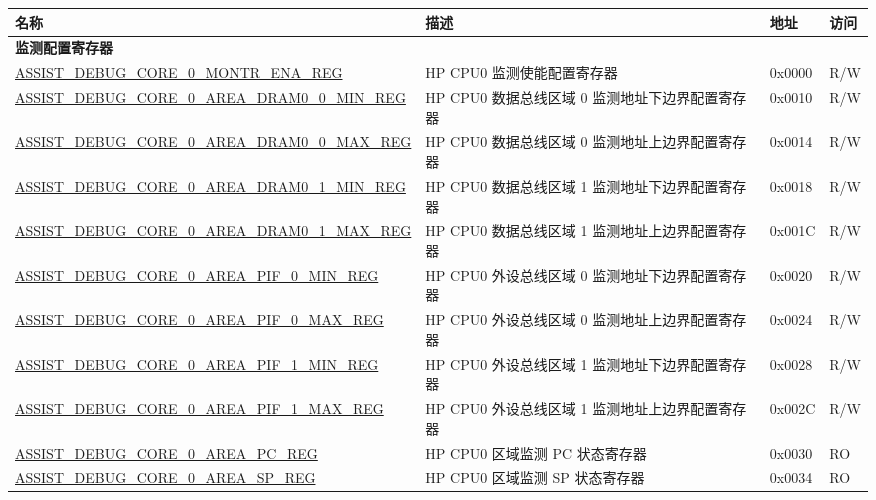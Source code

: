 \begin{longtable}{ | p{8.7cm} | m{5cm} | p{1.2cm} | p{0.75cm} | }
\hline\rowcolor{lightgray}
{\bfseries 名称} & {\bfseries 描述} &  {\bfseries 地址} & {\bfseries 访问} \\ \hline
\endhead
\multicolumn{4}{|l|}{\textbf{监测配置寄存器}} \\ \hline
\hyperref[regdesc:ASSISTDEBUGCORE0MONTRENAREG]{ASSIST\_DEBUG\_CORE\_0\_MONTR\_ENA\_REG} & HP CPU0 监测使能配置寄存器 & 0x0000 & R/W \\ \hline
\hyperref[regdesc:ASSISTDEBUGCORE0AREADRAM00MINREG]{ASSIST\_DEBUG\_CORE\_0\_AREA\_DRAM0\_0\_MIN\_REG} & HP CPU0 数据总线区域 0 监测地址下边界配置寄存器 & 0x0010 & R/W \\ \hline
\hyperref[regdesc:ASSISTDEBUGCORE0AREADRAM00MAXREG]{ASSIST\_DEBUG\_CORE\_0\_AREA\_DRAM0\_0\_MAX\_REG} & HP CPU0 数据总线区域 0 监测地址上边界配置寄存器 & 0x0014 & R/W \\ \hline
\hyperref[regdesc:ASSISTDEBUGCORE0AREADRAM01MINREG]{ASSIST\_DEBUG\_CORE\_0\_AREA\_DRAM0\_1\_MIN\_REG} & HP CPU0 数据总线区域 1 监测地址下边界配置寄存器 & 0x0018 & R/W \\ \hline
\hyperref[regdesc:ASSISTDEBUGCORE0AREADRAM01MAXREG]{ASSIST\_DEBUG\_CORE\_0\_AREA\_DRAM0\_1\_MAX\_REG} & HP CPU0 数据总线区域 1 监测地址上边界配置寄存器 & 0x001C & R/W \\ \hline
\hyperref[regdesc:ASSISTDEBUGCORE0AREAPIF0MINREG]{ASSIST\_DEBUG\_CORE\_0\_AREA\_PIF\_0\_MIN\_REG} & HP CPU0 外设总线区域 0 监测地址下边界配置寄存器 & 0x0020 & R/W \\ \hline
\hyperref[regdesc:ASSISTDEBUGCORE0AREAPIF0MAXREG]{ASSIST\_DEBUG\_CORE\_0\_AREA\_PIF\_0\_MAX\_REG} & HP CPU0 外设总线区域 0 监测地址上边界配置寄存器 & 0x0024 & R/W \\ \hline
\hyperref[regdesc:ASSISTDEBUGCORE0AREAPIF1MINREG]{ASSIST\_DEBUG\_CORE\_0\_AREA\_PIF\_1\_MIN\_REG} & HP CPU0 外设总线区域 1 监测地址下边界配置寄存器 & 0x0028 & R/W \\ \hline
\hyperref[regdesc:ASSISTDEBUGCORE0AREAPIF1MAXREG]{ASSIST\_DEBUG\_CORE\_0\_AREA\_PIF\_1\_MAX\_REG} & HP CPU0 外设总线区域 1 监测地址上边界配置寄存器 & 0x002C & R/W \\ \hline
\hyperref[regdesc:ASSISTDEBUGCORE0AREAPCREG]{ASSIST\_DEBUG\_CORE\_0\_AREA\_PC\_REG} & HP CPU0 区域监测 PC 状态寄存器 & 0x0030 & RO \\ \hline
\hyperref[regdesc:ASSISTDEBUGCORE0AREASPREG]{ASSIST\_DEBUG\_CORE\_0\_AREA\_SP\_REG} & HP CPU0 区域监测 SP 状态寄存器 & 0x0034 & RO \\ \hline

\end{longtable}
